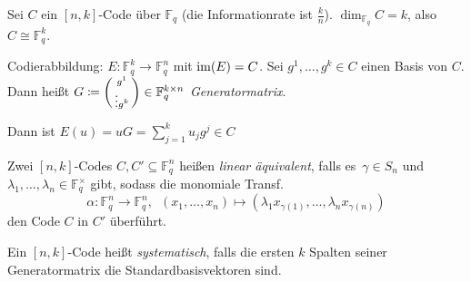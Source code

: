 \documentclass{cheat-sheet}
\newcommand{\F}{\mathbb{F}} %
\begin{document}


Sei $C$ ein $[n,k]$-Code über $\F_q$ (die Informationrate ist $\tfrac{k}{n}$).
$\dim_{\F_q} C = k$, also $C \cong \F_q^k$.

Codierabbildung: $E : \F_q^k \to \F_q^n$ mit $\operatorname{im}(E) = C$.
Sei $g^1, \ldots, g^k \in C$ einen Basis von $C$.
Dann heißt $G \coloneqq \begin{psmallmatrix}
  g^1 \\ \vdots g^k
\end{psmallmatrix} \in \F_q^{k \times n}$ \emph{Generatormatrix}.

Dann ist $E(u) = uG = \sum_{j=1}^k u_j g^j \in C$


\begin{defn}
  Zwei $[n,k]$-Codes $C, C' \subseteq \F_q^n$ heißen \emph{linear äquivalent}, falls es~$\gamma \in S_n$ und $\lambda_1, \ldots, \lambda_n \in \F_q^{\times}$ gibt, sodass die monomiale Transf. \[ \alpha : \F_q^n \to \F_q^n, \enspace (x_1, \ldots, x_n) \mapsto (\lambda_1 x_{\gamma(1)}, \ldots, \lambda_n x_{\gamma(n)}) \]
  den Code $C$ in $C'$ überführt.
\end{defn}

\iffalse
\begin{bspe}
  binäre $[5, 2, 3]$-Codes
  
  $C_1$ hat Generatormatrix $G_1 = \begin{psmallmatrix}
    11100 \\
    00111
  \end{psmallmatrix}$,
  $C_1 = \{ 00000, 111100, 00111, 11011 \}$
  
  $C_2$ hat Generatormatrix $G_2 = \begin{psmallmatrix}
    011001 \\
    10110
  \end{psmallmatrix}$
  $C_2 = \{ 00000, 01101, 10110, 11011 \}$
\end{bspe}
\fi

\begin{defn}
  Ein $[n,k]$-Code heißt \emph{systematisch}, falls die ersten $k$ Spalten seiner Generatormatrix die Standardbasisvektoren sind.
\end{defn}

\end{document}
